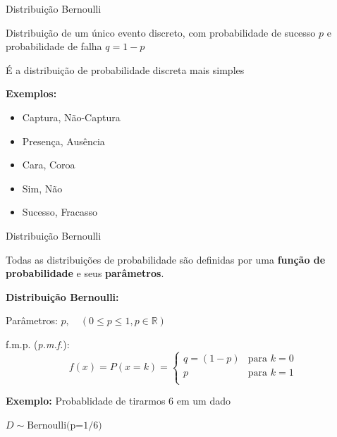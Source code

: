 \documentclass{beamer}\usepackage[]{graphicx}\usepackage[]{color}
\begin{document}
\begin{frame}{Distribuição Bernoulli}

Distribuição de um único evento discreto, com probabilidade de sucesso $p$ e probabilidade de falha $q = 1-p$

É a distribuição de probabilidade discreta mais simples 

\vfill

\alert{\textbf{Exemplos:}}

\begin{itemize}
  \item Captura, Não-Captura
  \item Presença, Ausência
  \item Cara, Coroa
  \item Sim, Não
  \item Sucesso, Fracasso
\end{itemize}
  
\end{frame} 

\begin{frame}{Distribuição Bernoulli}

Todas as distribuições de probabilidade são definidas por uma \textbf{função de probabilidade} e seus \textbf{parâmetros}. 

\vfill
\textbf{Distribuição Bernoulli:}
  
\vfill

Parâmetros: $p, \quad (0 \leq p \leq 1, p \in \mathbb{R})$

\vfill
f.m.p. (\emph{p.m.f.}):
$$
f(x) = P(x=k) =
  \begin{cases}
    q = (1-p) & \text{para } k= 0 \\
    p & \text{para } k=1  \\
  \end{cases}
$$

\vfill

\alert{\textbf{Exemplo:}} Probablidade de tirarmos 6 em um dado

\centering $D \sim \text{Bernoulli(p=1/6)}$

\end{frame} 
\end{document}
